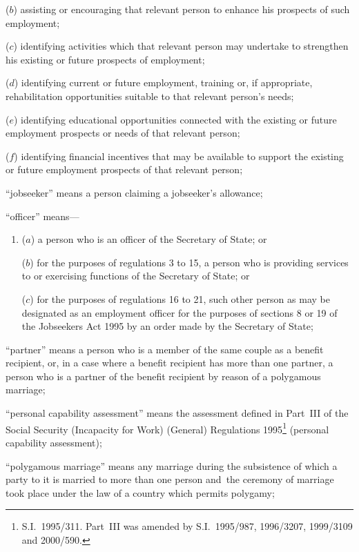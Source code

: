 \documentclass[12pt,a4paper]{article}
\begin{document}
\begin{enumerate}
\begin{enumerate}
($b$) 
assisting or encouraging that relevant person to enhance his prospects of such employment;

($c$) 
identifying activities which that relevant person may undertake to strengthen his existing or future prospects of employment;

($d$) 
identifying current or future employment, training or, if appropriate, rehabilitation opportunities suitable to that relevant person’s needs;

($e$) 
identifying educational opportunities connected with the existing or future employment prospects or needs of that relevant person;

($f$) 
identifying financial incentives that may be available to support the existing or future employment prospects of that relevant person;
\end{enumerate}

“jobseeker” means a person claiming a jobseeker’s allowance;

“officer” means—
\begin{enumerate}\item[]
($a$) 
a person who is an officer of the Secretary of State; or

($b$) 
for the purposes of regulations 3 to 15, a person who is providing services to or exercising functions of the Secretary of State; or

($c$) 
for the purposes of regulations 16 to 21, such other person as may be designated as an employment officer for the purposes of sections 8 or 19 of the Jobseekers Act 1995 by an order made by the Secretary of State;
\end{enumerate}

“partner” means a person who is a member of the same couple as a benefit recipient, or, in a case where a benefit recipient has more than one partner, a person who is a partner of the benefit recipient by reason of a polygamous marriage;

“personal capability assessment” means the assessment defined in Part~III of the Social Security (Incapacity for Work) (General) Regulations 1995\footnote{S.I.~1995/311. Part~III was amended by S.I.~1995/987, 1996/3207, 1999/3109 and 2000/590.} (personal capability assessment);

“polygamous marriage” means any marriage during the subsistence of which a party to it is married to more than one person and~the ceremony of marriage took place under the law of a country which permits polygamy;


\end{enumerate}
\end{document}
